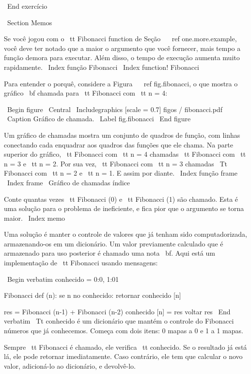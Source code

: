 \documentclass[10pt]{book}
\begin{document}
\begin {itemize}
{{{{{{{\ End {} exercício


\ Section {} Memos

Se você jogou com o {\ tt Fibonacci} function de
Seção ~ \ ref {} one.more.example, você deve ter notado que a maior
o argumento que você fornecer, mais tempo a função demora para executar.
Além disso, o tempo de execução aumenta muito rapidamente.
\ Index {função Fibonacci}
\ Index {function! Fibonacci}

Para entender o porquê, considere a Figura ~ \ ref {} fig.fibonacci, o que mostra
o gráfico {\ bf chamada} para {\ tt Fibonacci} com {\ tt n = 4}:

\ Begin {figure}
\ Central
{\ Includegraphics [scale = 0.7] {figos / fibonacci.pdf}}
\ Caption {Gráfico de chamada.}
\ Label {} fig.fibonacci
\ End {figure}

Um gráfico de chamadas mostra um conjunto de quadros de função, com linhas conectando cada
enquadrar aos quadros das funções que ele chama. Na parte superior do
gráfico, {\ tt Fibonacci} com {\ tt n = 4} chamadas {\ tt Fibonacci} com {\ tt
n = 3} e {\ tt n = 2}. Por sua vez, {\ tt Fibonacci} com {\ tt n = 3} chamadas
{\ Tt Fibonacci} com {\ tt n = 2} e {\ tt n = 1}. E assim por diante.
\ Index {função frame}
\ Index {frame}
\ {Gráfico de chamadas} índice

Conte quantas vezes {\ tt Fibonacci (0)} e {\ tt Fibonacci (1)} são
chamado. Esta é uma solução para o problema de ineficiente, e fica
pior que o argumento se torna maior.
\ Index {memo}

Uma solução é manter o controle de valores que já tenham sido
computadorizada, armazenando-os em um dicionário. Um valor previamente calculado
que é armazenado para uso posterior é chamado uma nota {\ bf}. Aqui está um
implementação de {\ tt Fibonacci} usando mensagens:

\ Begin {verbatim}
conhecido = {0:0, 1:01}

Fibonacci def (n):
    se n no conhecido:
        retornar conhecido [n]

    res = Fibonacci (n-1) + Fibonacci (n-2)
    conhecido [n] = res
    voltar res
\ End {verbatim}
%
{\ Tt conhecido} é um dicionário que mantém o controle do Fibonacci
números que já conhecemos. Começa com
dois itens: 0 mapas a 0 e 1 a 1 mapas.

Sempre {\ tt Fibonacci} é chamado, ele verifica {\ tt conhecido}.
Se o resultado já está lá, ele pode retornar
imediatamente. Caso contrário, ele tem que
calcular o novo valor, adicioná-lo ao dicionário, e devolvê-lo.

}}}}}}}
\end{itemize}
\end{document}
